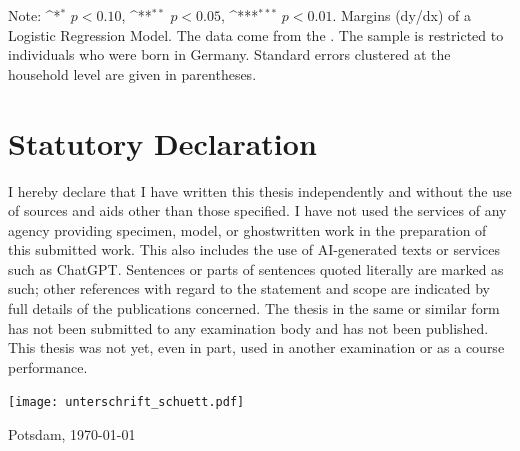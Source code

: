\documentclass[a4paper, oneside, hyperfootnotes = false]{article}
\def\sym#1{\ifmmode^{#1}\else\(^{#1}\)\fi}
\begin{document}
{\begin{table}[ht]
\begin{center}
		\vspace{2mm}
		
		\parbox{10cm}{
			\linespread{1}\footnotesize Note: \sym{*} \(p<0.10\), \sym{**} \(p<0.05\), \sym{***} \(p<0.01\). Margins (dy/dx) of a Logistic Regression Model. The data come from the \cite{SOEP2023}. The sample is restricted to individuals who were born in Germany. Standard errors clustered at the household level are given in parentheses.}
		
	\end{center}
\end{table}

\clearpage

}
{\fontsize{11pt}{11pt}\selectfont

{}
\section*{Statutory Declaration}
\label{declarations}

I hereby declare that I have written this thesis independently and without the use of sources and aids other than those specified. I have not used the services of any agency providing specimen, model, or ghostwritten work in the preparation of this submitted work. This also includes the use of AI-generated texts or services such as ChatGPT. Sentences or parts of sentences quoted literally are marked as such; other references with regard to the statement and scope are indicated by full details of the publications concerned. The thesis in the same or similar form has not been submitted to any examination body and has not been published. This thesis was not yet, even in part, used in another examination or as a course performance.

\vspace{1.5cm}

\texttt{[image: unterschrift\_schuett.pdf]}

\noindent Potsdam, \today{}

} %
\end{document}
